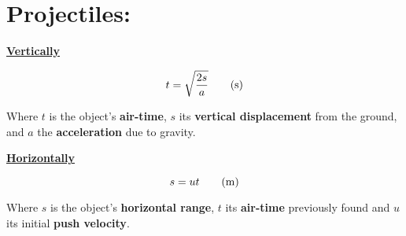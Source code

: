 \documentclass[11pt]{article}
\begin{document}
\section{Projectiles: }
\begin{multicols}{2}
	\begin{center}
		\underline{\textbf{Vertically}}
	\end{center}
\begin{equation}
	t=\sqrt{\frac{2s}{a}}\tag{\si{\second}}
\end{equation}
\begin{center}
	Where $t$ is the object's \textbf{air-time}, $s$ its \textbf{vertical displacement} from the ground, and $a$ the \textbf{acceleration} due to gravity.
\end{center}

\begin{center}
	\underline{\textbf{Horizontally}}
\end{center}

\begin{equation}
	s=ut\tag{\si{\meter}}
\end{equation}
\begin{center}
	Where $s$ is the object's \textbf{horizontal range}, $t$ its \textbf{air-time} previously found and $u$ its initial \textbf{push velocity}.
\end{center}
\end{multicols}
 
\end{document}
